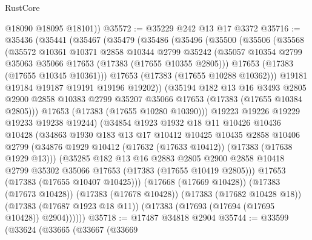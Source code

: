 \begin{lexlean}{RustCore}
\begin{coremodule}
        @18090
        @18095
        @18101))
@35572 := @35229 @242 @13 @17 @3372
@35716 := @35436
    (@35441
      (@35467
        (@35479
          (@35486
            (@35496
              (@35500
                (@35506
                  (@35568
                    (@35572
                      @10361
                      @10371
                      @2858
                      @10344
                      @2799
                      @35242
                      (@35057 @10354 @2799 @35063 @35066 @17653 (@17383 (@17655 @10355 @2805)))
                      @17653
                      (@17383 (@17655 @10345 @10361)))
                    @17653
                    (@17383 (@17655 @10288 @10362)))
                  @19181
                  @19184
                  @19187
                  @19191
                  @19196
                  @19202))
              (@35194
                @182
                @13
                @16
                @3493
                @2805
                @2900
                @2858
                @10383
                @2799
                @35207
                @35066
                @17653
                (@17383 (@17655 @10384 @2805)))
              @17653
              (@17383 (@17655 @10280 @10390)))
            @19223
            @19226
            @19229
            @19233
            @19238
            @19244)
          (@34854
            @1923
            @1932
            @18
            @11
            @10426
            @10436
            @10428
            (@34863
              @1930
              @183
              @13
              @17
              @10412
              @10425
              @10435
              @2858
              @10406
              @2799
              (@34876 @1929 @10412 (@17632 (@17633 @10412)) (@17383 (@17638 @1929 @13)))
              (@35285
                @182
                @13
                @16
                @2883
                @2805
                @2900
                @2858
                @10418
                @2799
                @35302
                @35066
                @17653
                (@17383 (@17655 @10419 @2805)))
              @17653
              (@17383 (@17655 @10407 @10425)))
            (@17668 (@17669 @10428))
            (@17383 (@17673 @10428))
            (@17383 (@17678 @10428))
            (@17383 (@17682 @10428 @18))
            (@17383 (@17687 @1923 @18 @11))
            (@17383 (@17693 (@17694 (@17695 @10428)) @2904))))))
@35718 := @17487 @34818 @2904
@35744 := @33599
    (@33624
      (@33665
        (@33667
          (@33669

\end{coremodule}
\end{lexlean}
